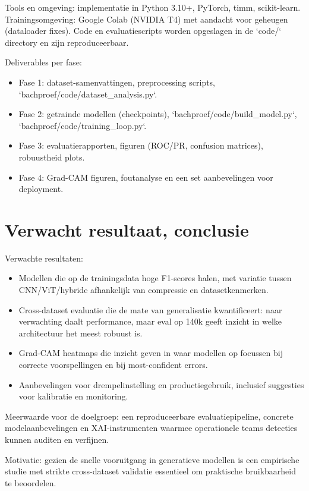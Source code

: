 Tools en omgeving: implementatie in Python 3.10+, PyTorch, timm, scikit-learn. Trainingsomgeving: Google Colab (NVIDIA T4) met aandacht voor geheugen (dataloader fixes). Code en evaluatiescripts worden opgeslagen in de `code/` directory en zijn reproduceerbaar.

Deliverables per fase:
\begin{itemize}
  \item Fase 1: dataset-samenvattingen, preprocessing scripts, `bachproef/code/dataset\_analysis.py`.
  \item Fase 2: getrainde modellen (checkpoints), `bachproef/code/build\_model.py`, `bachproef/code/training\_loop.py`.
  \item Fase 3: evaluatierapporten, figuren (ROC/PR, confusion matrices), robuustheid plots.
  \item Fase 4: Grad-CAM figuren, foutanalyse en een set aanbevelingen voor deployment.
\end{itemize}

\section{Verwacht resultaat, conclusie}%
\label{sec:verwachte_resultaten}

Verwachte resultaten:
\begin{itemize}
  \item Modellen die op de trainingsdata hoge F1-scores halen, met variatie tussen CNN/ViT/hybride afhankelijk van compressie en datasetkenmerken.
  \item Cross-dataset evaluatie die de mate van generalisatie kwantificeert: naar verwachting daalt performance, maar eval op 140k geeft inzicht in welke architectuur het meest robuust is.
  \item Grad-CAM heatmaps die inzicht geven in waar modellen op focussen bij correcte voorspellingen en bij most-confident errors.
  \item Aanbevelingen voor drempelinstelling en productiegebruik, inclusief suggesties voor kalibratie en monitoring.
\end{itemize}

Meerwaarde voor de doelgroep: een reproduceerbare evaluatiepipeline, concrete modelaanbevelingen en XAI-instrumenten waarmee operationele teams detecties kunnen auditen en verfijnen.

Motivatie: gezien de snelle vooruitgang in generatieve modellen is een empirische studie met strikte cross-dataset validatie essentieel om praktische bruikbaarheid te beoordelen.

